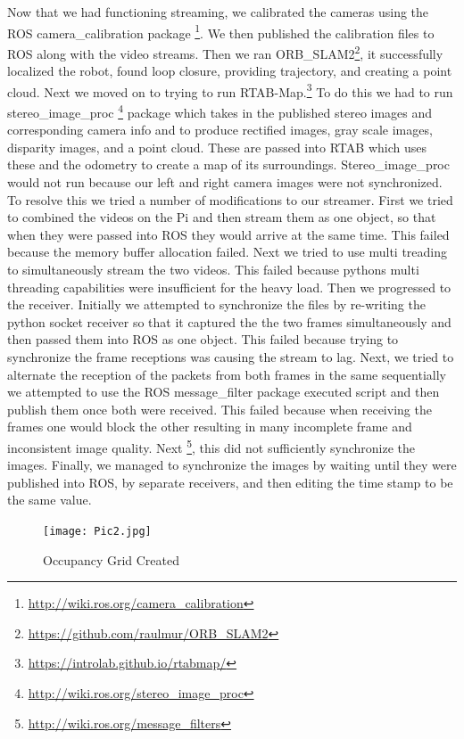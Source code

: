 \documentclass[10pt]{article}
\begin{document}
Now that we had functioning streaming, we calibrated the cameras using the ROS camera\_calibration package \footnote{\href{http://wiki.ros.org/camera\_calibration}{http://wiki.ros.org/camera\_calibration}}. We then published the calibration files to ROS along with the video streams. Then we ran ORB\_SLAM2\footnote{\href{https://github.com/raulmur/ORB_SLAM2}{https://github.com/raulmur/ORB\_SLAM2}}, it successfully localized the robot, found loop closure, providing trajectory, and creating a point cloud. Next we moved on to trying to run RTAB-Map.\footnote{\href{https://introlab.github.io/rtabmap/}{https://introlab.github.io/rtabmap/}} To do this we had to run stereo\_image\_proc \footnote{\href{http://wiki.ros.org/stereo\_image\_proc}{http://wiki.ros.org/stereo\_image\_proc}} package which takes in the published stereo images and corresponding camera info and to produce rectified images, gray scale images, disparity images, and a point cloud. These are passed into RTAB which uses these and the odometry to create a map of its surroundings. Stereo\_image\_proc would not run because our left and right camera images were not synchronized. To resolve this we tried a number of modifications to our streamer. First we tried to combined the videos on the Pi and then stream them as one object, so that when they were passed into ROS they would arrive at the same time. This failed because the memory buffer allocation failed. Next we tried to use multi treading to simultaneously stream the two videos. This failed because pythons multi threading capabilities were insufficient for the heavy load. Then we progressed to the receiver. Initially we attempted to synchronize the files by re-writing the python socket receiver so that it captured the the two frames simultaneously and then passed them into ROS as one object. This failed because trying to synchronize the frame receptions was causing the stream to lag. Next, we tried to alternate the reception of the packets from both frames in the same sequentially we attempted to use the ROS message\_filter package executed script and then publish them once both were received. This failed because when receiving the frames one would block the other resulting in many incomplete frame and inconsistent image quality. Next \footnote{\href{http://wiki.ros.org/message\_filters}{http://wiki.ros.org/message\_filters}}, this did not sufficiently synchronize the images. Finally, we managed to synchronize the images by waiting until they were published into ROS, by separate receivers, and then editing the time stamp to be the same value.
\begin{figure}[!h]
\centering \texttt{[image: Pic2.jpg]}\label{Occupancy Grid Created}
\caption{Occupancy Grid Created}
\end{figure}
\end{document}
